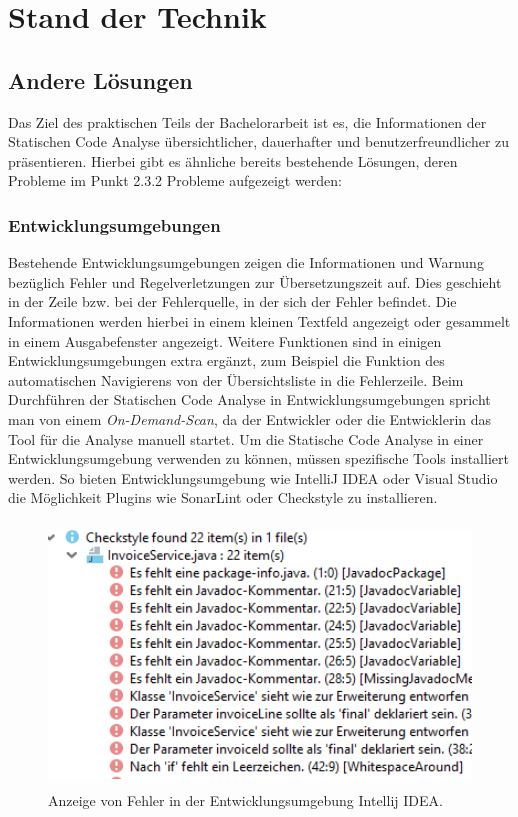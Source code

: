 
\chapter{Stand der Technik}
\section{Andere Lösungen}
Das Ziel des praktischen Teils der Bachelorarbeit ist es, die Informationen der Statischen Code Analyse übersichtlicher, dauerhafter und benutzerfreundlicher zu präsentieren. Hierbei gibt es ähnliche bereits bestehende Lösungen, deren Probleme im Punkt 2.3.2 Probleme aufgezeigt werden: 

\subsection{Entwicklungsumgebungen}
Bestehende Entwicklungsumgebungen zeigen die Informationen und Warnung bezüglich Fehler und Regelverletzungen zur Übersetzungszeit auf. Dies geschieht in der Zeile bzw. bei der Fehlerquelle, in der sich der Fehler befindet. Die Informationen werden hierbei in einem kleinen Textfeld angezeigt oder gesammelt in einem Ausgabefenster angezeigt. Weitere Funktionen  sind in einigen Entwicklungsumgebungen extra ergänzt, zum Beispiel die Funktion des automatischen Navigierens von der Übersichtsliste in die Fehlerzeile. Beim Durchführen der Statischen Code Analyse in Entwicklungsumgebungen spricht man von einem \textit{On-Demand-Scan}, da der Entwickler oder die Entwicklerin das Tool für die Analyse manuell startet. Um die Statische Code Analyse in einer Entwicklungsumgebung verwenden zu können, müssen spezifische Tools installiert werden. So bieten Entwicklungsumgebung wie IntelliJ IDEA oder Visual Studio die Möglichkeit Plugins wie SonarLint oder Checkstyle zu installieren. \cite{sonarLint}
\begin{figure}[tp]
  \centering
  \includegraphics[height=7cm]{images/ideChecks.PNG}
 \caption[Anzeige von Fehler in der Entwicklungsumgebung Intellij IDEA]{Anzeige von Fehler in der Entwicklungsumgebung Intellij IDEA.}
  \label{fig:engine}
\end{figure}

